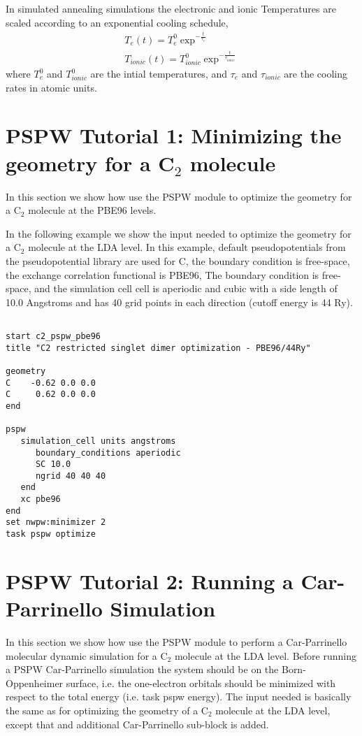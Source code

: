 In simulated annealing simulations the electronic and ionic Temperatures are scaled 
according to an exponential cooling schedule,
\begin{eqnarray}
T_e(t) = T_e^0 \exp^{-\frac{t}{\tau_e}}\\
T_{ionic}(t) = T_{ionic}^0 \exp^{-\frac{t}{\tau_{ionic}}}
\end{eqnarray}
where $T_e^0$ and $T_{ionic}^0$ are the intial temperatures, and $\tau_e$ and $\tau_{ionic}$
are the cooling rates in atomic units.  



\section{PSPW Tutorial 1: Minimizing the geometry for a C$_2$ molecule}
\label{sec:pspw_sd}

In this section we show how use the PSPW module to optimize the geometry 
for a C$_2$ molecule at the PBE96 levels. 

In the following example we show the input needed to optimize the geometry
for a C$_2$ molecule at the LDA level.  In this example, default pseudopotentials
from the pseudopotential library are used for C, the boundary condition is free-space, 
the exchange correlation functional is PBE96, The boundary condition is free-space, and 
the simulation cell cell is aperiodic and cubic with a side length of 10.0 Angstroms and has
40 grid points in each direction (cutoff energy is 44 Ry).  
\begin{verbatim}
         
start c2_pspw_pbe96
title "C2 restricted singlet dimer optimization - PBE96/44Ry"

geometry  
C    -0.62 0.0 0.0
C     0.62 0.0 0.0
end
       
pspw
   simulation_cell units angstroms
      boundary_conditions aperiodic
      SC 10.0
      ngrid 40 40 40
   end
   xc pbe96
end
set nwpw:minimizer 2
task pspw optimize
\end{verbatim}



\normalsize
\section{PSPW Tutorial 2: Running a Car-Parrinello Simulation}
\label{sec:pspw_cp}
\normalsize

In this section we show how use the PSPW module to perform a Car-Parrinello
molecular dynamic simulation for a C$_2$ molecule at the LDA level.  
Before running a PSPW Car-Parrinello  simulation the system should be
on the Born-Oppenheimer surface, i.e. the one-electron orbitals should be minimized 
with respect to the total energy (i.e. task pspw energy).  The input needed
is basically the same as for optimizing the geometry of a C$_2$ molecule at the LDA level,
except that and additional Car-Parrinello sub-block is added.  

